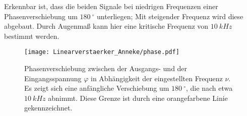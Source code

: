 Erkennbar ist, dass die beiden Signale bei niedrigen Frequenzen einer Phasenverschiebung um $\SI{180}{^\circ}$ unterliegen; Mit steigender Frequenz wird diese abgebaut.
Durch Augenmaß kann hier eine kritische Frequenz von $\SI{10}{kHz}$ bestimmt werden.
\begin{figure}[h]
  \centering
  \texttt{[image: Linearverstaerker\_Anneke/phase.pdf]}
  \caption{Phasenverschiebung zwischen der Ausgangs- und der Eingangsspannung $\varphi$ in Abhängigkeit der eingestellten Frequenz $\nu$. Es zeigt sich eine anfängliche Verschiebung um $\SI{180}{^\circ}$, die nach etwa $\SI{10}{kHz}$ abnimmt. Diese Grenze ist durch eine orangefarbene Linie gekennzeichnet.}
  \label{phase}
\end{figure}


%
